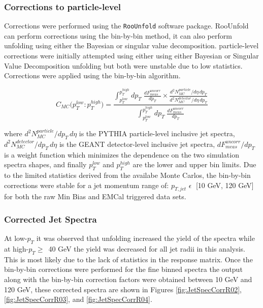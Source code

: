 \subsubsection{Corrections to particle-level}

Corrections were performed using the \verb+RooUnfold+\cite{Adye:2011gm} software package.  RooUnfold can perform corrections using the bin-by-bin method, it can also perform unfolding using either the Bayesian or singular value decomposition.  particle-level corrections were initially attempted using either using either Bayesian or Singular Value Decomposition unfolding but both were unstable due to low statistics. Corrections were applied using the bin-by-bin\cite{Cowan:2002in} algorithm. 

\begin{equation}
C_{MC} \big( p_{T}^{low} : p_{T}^{high} \big) =  \frac{  \int^{p_{T}^{high}}_{p_{T}^{low}} dp_{T} \; \frac{dF^{uncorr}_{meas}}{dp_{T}} \times \frac{d^{2}N^{particle}_{MC}/d\eta \, dp_{T}}{d^{2}N^{detector}_{MC}/d\eta \, dp_{T}}  } { \int^{p_{T}^{high}}_{p_{T}^{low}} dp_{T} \; \frac{dF^{uncorr}_{meas}}{dp_{T}} }
\label{eq:binbybin}
\end{equation}

\noindent
where $d^{2}N^{particle}_{MC}/dp_{T} \, d\eta$ is the PYTHIA particle-level inclusive jet spectra, $d^{2}N^{detector}_{MC}/dp_{T} \, d\eta$ is the GEANT detector-level inclusive jet spectra, $dF^{uncorr}_{meas} / dp_{T}$ is a weight function which minimizes the dependence on the two simulation spectra shapes, and finally $p_{T}^{low}$ and $p_{T}^{high}$ are the lower and upper bin limits.  Due to the limited statistics derived from the availabe Monte Carlos, the bin-by-bin corrections were stable for a jet momentum range of: $p_{T,jet} \, \, \epsilon \;$ [10 GeV, 120 GeV] for both the raw Min Bias and EMCal triggered data sets.  

\subsubsection{Corrected Jet Spectra}


At low-$p_{T}$ it was observed that unfolding increased the yield of the spectra while at high-$p_{T} \geq \,$ 40 GeV the yield was decreased for all jet radii in this analysis.  This is most likely due to the lack of statistics in the response matrix.  Once the bin-by-bin corrections were performed for the fine binned spectra the output along with the bin-by-bin correction factors were obtained between 10 GeV and 120 GeV, these corrected spectra are shown in Figures \ref{fig:JetSpecCorrR02}, \ref{fig:JetSpecCorrR03}, and \ref{fig:JetSpecCorrR04}.

